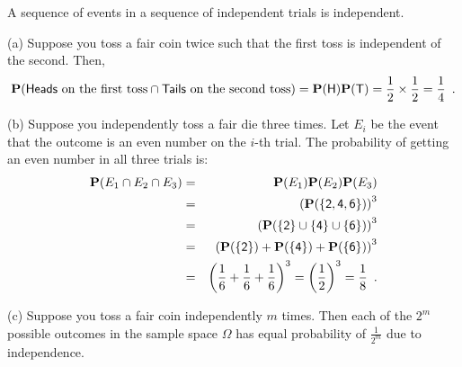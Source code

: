 \begin{example}\label{EX:SStsExs}
A sequence of events in a sequence of independent trials is independent.
\be

\item[(a)] Suppose you toss a fair coin twice such that the first toss is independent of the second.  Then,
$$
\mathbf{P}(\mathsf{Heads} \text{ on the first toss} \cap \mathsf{Tails} \text{ on the second toss} ) = \mathbf{P}(\mathsf{H}) \mathbf{P}(\mathsf{T}) = \frac{1}{2} \times \frac{1}{2}= \frac{1}{4} \enspace .
$$

\item[(b)] Suppose you independently toss a fair die three times.  Let $E_i$ be the event that the outcome is an even number on the $i$-th trial.  The probability of getting an even number in all three trials is:
\begin{eqnarray*}
\mathbf{P}(E_1 \cap E_2 \cap E_3)
&=& \mathbf{P}(E_1) \mathbf{P}(E_2) \mathbf{P}(E_3)\\
&=& \left(\mathbf{P}(\{\mathsf{2,4,6}\})\right)^3\\
&=& \left(\mathbf{P}(\{\mathsf{2}\} \cup \{\mathsf{4}\} \cup \{\mathsf{6}\}) \right)^3 \\
&=& \left(\mathbf{P}(\{\mathsf{2}\}) + \mathbf{P}(\{\mathsf{4}\}) + \mathbf{P}(\{\mathsf{6}\})\right)^3\\
&=& \left(\frac{1}{6} + \frac{1}{6} + \frac{1}{6} \right)^3 
= \left(\frac{1}{2} \right)^3
= \frac{1}{8} \enspace .
\end{eqnarray*}

\item[(c)]Suppose you toss a fair coin independently $m$ times.  Then each of the $2^m$ possible outcomes in the sample space $\Omega$ has equal probability of $\frac{1}{2^m}$ due to independence.
\ee
\end{example}

